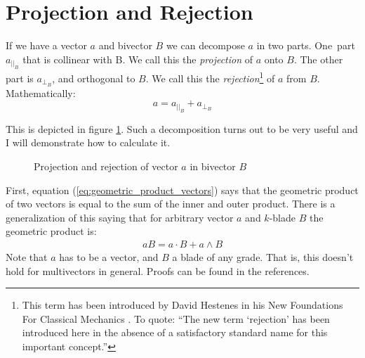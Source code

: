 \documentclass[10pt]{report}
\begin{document}
\section{Projection and Rejection}

If we have a vector $a$ and bivector $B$ we can decompose $a$ in
two parts. One\ part $a_{||_{B}}$ that is collinear with B. We
call this the \emph{projection} of $a$ onto $B$. The other part is
$a_{\bot_{B}}$, and orthogonal to $B$. We call this the
\emph{rejection}\footnote{This term has been introduced by David
Hestenes in his New Foundations For Classical Mechanics
\cite{bib:hestenes new foundations}. To quote: ``The new term
`rejection' has been introduced here in the absence of a
satisfactory standard name for this important concept.''} of $a$
from $B$. Mathematically:
\begin{equation}
        a = a_{||_{B}} + a_{\bot_{B}}
        \label{eq:decomposition}
\end{equation}

This is depicted in figure \ref{fig:proj rej}. Such a
decomposition turns out to be very useful and I will demonstrate
how to calculate it.
\begin{figure}[ht]
\centering

\caption{Projection and rejection of vector $a$ in bivector $B$}
\label{fig:proj rej}
\end{figure}

First, equation (\ref{eq:geometric_product_vectors}) says that the
geometric product of two vectors is equal to the sum of the inner
and outer product. There is a generalization of this saying that
for arbitrary vector $a$ and $k$-blade $B$ the geometric product
is:
\begin{align}
    aB = a\cdot B + a\wedge B
    \label{eq:geom prod a B}
\end{align}
Note that $a$ has to be a vector, and $B$ a blade of any grade.
That is, this doesn't hold for multivectors in general. Proofs can
be found in the references. \cite{bib:chris doran thesis}
\cite{bib:hestenes new foundations}
\end{document}
